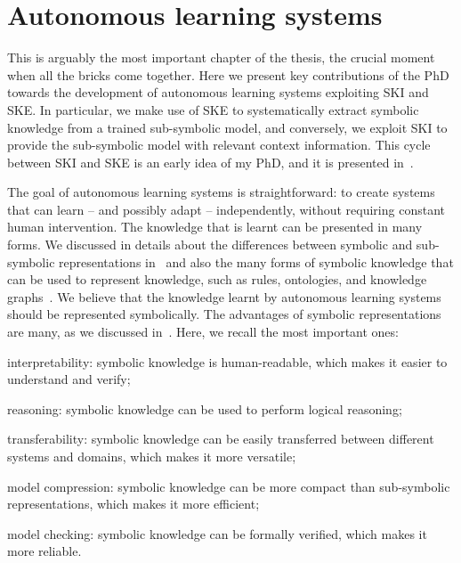
\chapter{Autonomous learning systems}
\label{ch:autonomous-learning-systems}
\minitoc


This is arguably the most important chapter of the thesis, the crucial moment when all the bricks come together.
%
Here we present key contributions of the PhD towards the development of autonomous learning systems exploiting \gls{SKI} and \gls{SKE}.
%
In particular, we make use of \gls{SKE} to systematically extract symbolic knowledge from a trained sub-symbolic model, and conversely, we exploit \gls{SKI} to provide the sub-symbolic model with relevant context information.
%
This cycle between \gls{SKI} and \gls{SKE} is an early idea of my PhD, and it is presented in~.


%
The goal of autonomous learning systems is straightforward: to create systems that can learn -- and possibly adapt -- independently, without requiring constant human intervention.
%
The knowledge that is learnt can be presented in many forms.
%
We discussed in details about the differences between symbolic and sub-symbolic representations in~ and also the many forms of symbolic knowledge that can be used to represent knowledge, such as rules, ontologies, and knowledge graphs~.
%
We believe that the knowledge learnt by autonomous learning systems should be represented symbolically.
%
The advantages of symbolic representations are many, as we discussed in~.
%
Here, we recall the most important ones:
%
\begin{inlinelist}
    \item interpretability: symbolic knowledge is human-readable, which makes it easier to understand and verify;
    \item reasoning: symbolic knowledge can be used to perform logical reasoning;
    \item transferability: symbolic knowledge can be easily transferred between different systems and domains, which makes it more versatile;
    \item model compression: symbolic knowledge can be more compact than sub-symbolic representations, which makes it more efficient;
    \item model checking: symbolic knowledge can be formally verified, which makes it more reliable.
\end{inlinelist}


